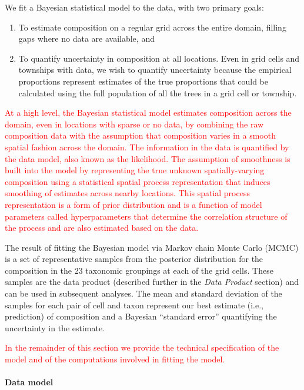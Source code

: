 \documentclass[10pt,letterpaper]{article}
\begin{document}
We fit a Bayesian statistical model to the data, with two primary
goals:
\begin{enumerate}
\item To estimate composition on a regular grid across the entire domain,
filling gaps where no data are available, and
\item To quantify uncertainty in composition at all locations. Even in grid
cells and townships with data, we wish to quantify uncertainty because
the empirical proportions represent estimates of the true proportions
that could be calculated using the full population of all the trees
in a grid cell or township.
\end{enumerate}
\textcolor{red}{At a high level, the Bayesian statistical model estimates
composition across the domain, even in locations with sparse or no
data, by combining the raw composition data with the assumption that
composition varies in a smooth spatial fashion across the domain.
The information in the data is quantified by the data model, also
known as the likelihood. The assumption of smoothness is built into
the model by representing the true unknown spatially-varying composition
using a statistical spatial process representation that induces smoothing
of estimates across nearby locations. This spatial process representation
is a form of prior distribution and is a function of model parameters
called hyperparameters that determine the correlation structure of
the process and are also estimated based on the data. }

The result of fitting the Bayesian model via Markov chain Monte Carlo
(MCMC) is a set of representative samples from the posterior distribution
for the composition in the 23 taxonomic groupings at each of the grid
cells. These samples are the data product (described further in the
\emph{Data Product} section) and can be used in subsequent analyses.
The mean and standard deviation of the samples for each pair of cell
and taxon represent our best estimate (i.e., prediction) of composition
and a Bayesian ``standard error'' quantifying the uncertainty in
the estimate. 

\textcolor{red}{In the remainder of this section we provide the technical
specification of the model and of the computations involved in fitting
the model.}



\paragraph*{Data model}
\end{document}
